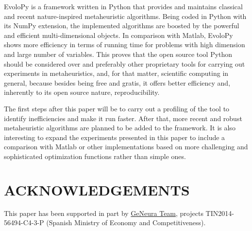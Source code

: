 \documentclass[a4paper,twoside]{article}
\begin{document}
EvoloPy is a framework written in Python that provides and maintains
classical and recent nature-inspired metaheuristic algorithms. Being
coded in Python with its NumPy extension, the implemented algorithms
are boosted by the powerful and efficient multi-dimensional
objects. In comparison with Matlab, EvoloPy shows more efficiency in
terms of running time for problems with  high dimension and large
number of variables. This proves that the open source tool Python
should be considered over and preferably other proprietary tools for
carrying out experiments in metaheuristics, and, for that matter,
scientific computing in general, because besides being free and
gratis, it offers better efficiency and, inherently to its open source
nature, reproducibility. 

The first steps after this paper will be to carry out a profiling of
the tool to identify inefficiencies and make it run faster. After
that, more recent and robust metaheuristic algorithms are
planned to be added to the framework. It is also interesting to expand
the experiments presented in this paper to include a comparison with
Matlab or other implementations based on more challenging and
sophisticated optimization functions rather than simple ones. 

\section{\uppercase{Acknowledgements}}

This paper has been supported in part by
\href{http://geneura.wordpress.com}{GeNeura Team}, 
projects TIN2014-56494-C4-3-P (Spanish Ministry of Economy and
Competitiveness).




{\small
}
\end{document}
